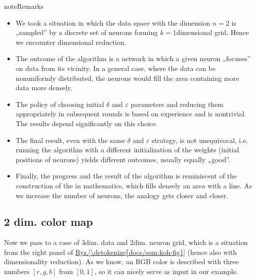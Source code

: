 \documentclass[a4paper,12pt,polish]{jupyterBook}
\begin{document}
\begin{sphinxadmonition}{note}{Remarks}
\begin{itemize}
\item {} 
\sphinxAtStartPar
We took a situation in which the data space with the dimension \(n = 2\) is „sampled” by a discrete set of neurons forming  \(k=1\)\sphinxhyphen{}dimensional grid. Hence we encounter dimensional reduction.

\item {} 
\sphinxAtStartPar
The outcome of the algorithm is a network in which a given neuron „focuses” on data from its vicinity. In a general case, where the data can be non\sphinxhyphen{}uniformly distributed, the neurons would fill the area containing more data more densely.

\item {} 
\sphinxAtStartPar
The policy of choosing initial \(\delta\) and \(\varepsilon \) parameters and reducing them appropriately in subsequent rounds is based on experience and is non\sphinxhyphen{}trivial. The results depend significantly on this choice.

\item {} 
\sphinxAtStartPar
The final result, even with the same \(\delta\) and \(\varepsilon \) strategy, is not unequivocal, i.e. running the algorithm with a different initialization of the weights (initial positions of neurons) yields different outcomes, usually equally „good”.

\item {} 
\sphinxAtStartPar
Finally, the progress and the result of the algorithm is reminiscent of the construction of the  in mathematics, which fills densely an area with a line.
As we increase the number of neurons, the analogy gets closer and closer.

\end{itemize}
\end{sphinxadmonition}


\subsection{2 dim. color map}
\label{\detokenize{docs/som:dim-color-map}}
\sphinxAtStartPar
Now we pass to a case of 3\sphinxhyphen{}dim. data and 2\sphinxhyphen{}dim. neuron grid, which is a situation from the right panel of \hyperref[\detokenize{docs/som:koh-fig}]{Rys.\@ \ref{\detokenize{docs/som:koh-fig}}} (hence also with dimensionality reduction). As we know, an RGB color is described with three numbers \([r,g,b]\) from \([0,1]\), so it can nicely serve as input in our example.
\end{document}

